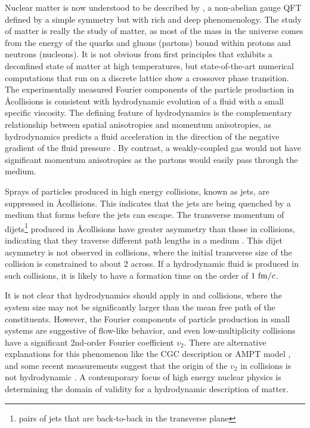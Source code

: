 Nuclear matter is now understood to be described by \qcd, a non-abelian gauge \ac{QFT} defined by a simple symmetry but with rich and deep phenomenology.
The study of \qcd matter is really the study of matter, as most of the mass in the universe comes from the energy of the quarks and gluons (partons) bound within protons and neutrons (nucleons).
It is not obvious from first principles that \qcd exhibits a deconfined state of matter at high temperatures, but state-of-the-art numerical computations that run \qcd on a discrete lattice show a crossover phase transition.
The experimentally measured Fourier components of the particle production in \AA collisions is consistent with hydrodynamic evolution of a fluid with a small specific viscosity.
The defining feature of hydrodynamics is the complementary relationship between spatial anisotropies and momentum anisotropies, as hydrodynamics predicts a fluid acceleration in the direction of the negative gradient of the fluid pressure \cite{Kolb:2003dz}. %
By contrast, a weakly-coupled gas would not have significant momentum anisotropies as the partons would easily pass through the medium.

Sprays of particles produced in high energy collisions, known as jets, are suppressed in \AA collisions.
This indicates that the jets are being quenched by a medium that forms before the jets can escape.
The transverse momentum of dijets\footnote{pairs of jets that are back-to-back in the transverse plane} produced in \AA collisions have greater asymmetry than those in \pp collisions, indicating that they traverse different path lengths in a medium \cite{HION-2010-02,HION-2012-11}.
This dijet asymmetry is not observed in \pA collisions, where the initial transverse size of the collision is constrained to about 2 \fm across.
If a hydrodynamic fluid is produced in such collisions, it is likely to have a formation time on the order of $1~\mathrm{fm}/c$.

It is not clear that hydrodynamics should apply in \pA and \pp collisions, where the system size may not be significantly larger than the mean free path of the constituents.
However, the Fourier components of particle production in small systems are suggestive of flow-like behavior, and even low-multiplicity \pp collisions have a significant 2nd-order Fourier coefficient $v_2$.
There are alternative explanations for this phenomenon like the \ac{CGC} description \cite{Iancu:2000hn} or \ac{AMPT} model \cite{Lin:2004en}, and some recent measurements suggest that the origin of the $v_2$ in \pp collisions is not hydrodynamic \cite{ATLAS-CONF-2017-068}.
A contemporary focus of high energy nuclear physics is determining the domain of validity for a hydrodynamic description of \qcd matter.

